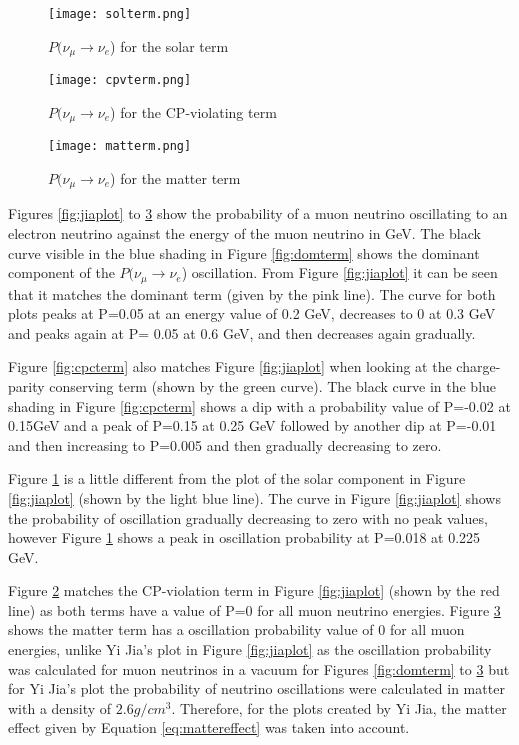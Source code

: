 \documentclass[11pt,oneside,a4paper]{article}
\begin{document}
	\begin{figure}
	\centering
	\captionsetup{justification=centering}
	\texttt{[image: solterm.png]}
	\caption{$P(\nu_{\mu} \rightarrow \nu_{e}$) for the solar term}
	\label{fig:solterm}
	\end{figure}

\begin{figure}
		\centering
		\captionsetup{justification=centering}
		\texttt{[image: cpvterm.png]}
		\caption{$P(\nu_{\mu} \rightarrow \nu_{e}$) for the CP-violating term}
		\label{fig:cpvterm}
	\end{figure}

	\begin{figure}
		\centering
		\texttt{[image: matterm.png]}
		\captionsetup{justification=centering}
		\caption{$P(\nu_{\mu} \rightarrow \nu_{e}$) for the matter term}
		\label{fig:matterm}
\end{figure}

Figures \ref{fig:jiaplot} to \ref{fig:matterm} show the probability of a muon neutrino oscillating to an electron neutrino against the energy of the muon neutrino in GeV.
The black curve visible in the blue shading in Figure \ref{fig:domterm} shows the dominant component of the $P(\nu_{\mu} \rightarrow \nu_{e}$) oscillation. From Figure \ref{fig:jiaplot} it can be seen that it matches the dominant term (given by the pink line). The curve for both plots peaks at P=0.05 at an energy value of 0.2 GeV, decreases to 0 at 0.3 GeV and peaks again at P= 0.05 at 0.6 GeV, and then decreases again gradually.

Figure \ref{fig:cpcterm} also matches Figure \ref{fig:jiaplot} when looking at the charge-parity conserving term (shown by the green curve). The black curve in the blue shading in Figure \ref{fig:cpcterm} shows a dip with a probability value of P=-0.02 at 0.15GeV and a peak of P=0.15 at 0.25 GeV followed by another dip at P=-0.01 and then increasing to P=0.005 and then gradually decreasing to zero.

Figure \ref{fig:solterm} is a little different from the plot of the solar component in Figure \ref{fig:jiaplot} (shown by the light blue line). The curve in Figure \ref{fig:jiaplot} shows the probability of oscillation gradually decreasing to zero with no peak values, however Figure \ref{fig:solterm} shows a peak in oscillation probability at P=0.018 at  0.225 GeV.

Figure \ref{fig:cpvterm} matches the CP-violation term in Figure \ref{fig:jiaplot} (shown by the red line) as both terms have a value of P=0 for all muon neutrino energies. Figure \ref{fig:matterm} shows the matter term has a oscillation probability value of 0 for all muon energies, unlike Yi Jia's plot in Figure \ref{fig:jiaplot} as the oscillation probability was calculated for muon neutrinos in a vacuum for Figures \ref{fig:domterm} to \ref{fig:matterm} but for Yi Jia's plot the probability of neutrino oscillations were calculated in matter with a density of $2.6g/cm^3$. Therefore, for the plots created by Yi Jia, the matter effect given by Equation \ref{eq:mattereffect} was taken into account. 
\end{document}
